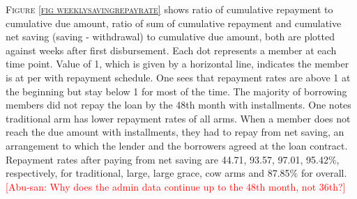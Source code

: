 \begin{figure}
\end{figure}

\begin{figure}
\end{figure}

	\textsc{\footnotesize Figure \ref{fig weeklysavingrepayrate}} shows ratio of cumulative repayment to cumulative due amount, ratio of sum of cumulative repayment and cumulative net saving (saving - withdrawal) to cumulative due amount, both are plotted against weeks after first disbursement. Each dot represents a member at each time point. Value of 1, which is given by a horizontal line, indicates the member is at per with repayment schedule. One sees that repayment rates are above 1 at the beginning but stay below 1 for most of the time. The majority of borrowing members did not repay the loan by the 48th month with installments. One notes \textsf{traditional} arm has lower repayment rates of all arms. When a member does not reach the due amount with installments, they had to repay from net saving, an arrangement to which the lender and the borrowers agreed at the loan contract. Repayment rates after paying from net saving are 44.71, 93.57, 97.01, 95.42\%, respectively, for \textsf{traditional, large, large grace, cow} arms and 87.85\% for overall. \textcolor{red}{[Abu-san: Why does the admin data continue up to the 48th month, not 36th?]}

